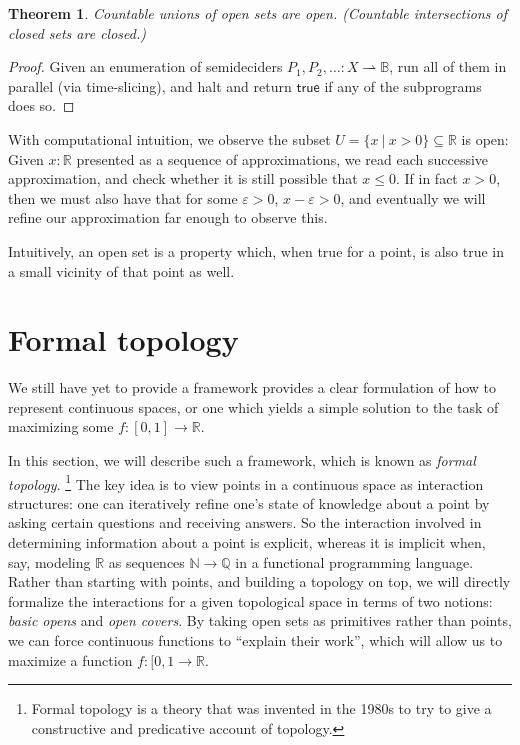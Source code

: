 \documentclass{article}
\newtheorem{theorem}{Theorem}
\newcommand{\nat}{\mathbb{N}}
\newcommand{\suchthat}{\ |\ }
\newcommand{\rat}{\mathbb{Q}}
\newcommand{\R}{\mathbb{R}}
\newcommand{\bool}{\mathbb{B}}
\begin{document}
\begin{theorem}
Countable unions of open sets are open. (Countable intersections of closed sets are closed.)
\end{theorem}
\begin{proof}
Given an enumeration of semideciders $P_1, P_2, \ldots : X \rightharpoonup \bool$, run all of them in parallel (via time-slicing), and halt and return $\mathsf{true}$ if any of the subprograms does so.
\end{proof}

With computational intuition, we observe the subset $U = \{ x \suchthat x > 0 \} \subseteq \R$ is open:
Given $x : \R$ presented as a sequence of approximations, we read each successive approximation, and check whether it is still possible that $x \le 0$. If in fact $x > 0$, then we must also have that for some $\varepsilon > 0$, $x - \varepsilon > 0$, and eventually we will refine our approximation far enough to observe this.

Intuitively, an open set is a property which, when true for a point, is also true in a small vicinity of that point as well.

\section{Formal topology}

We still have yet to provide a framework provides a clear formulation of how to represent continuous spaces, or one which yields a simple solution to the task of maximizing some $f : [0,1] \to \R$.

In this section, we will describe such a framework, which is known as \emph{formal topology}.
\footnote{Formal topology is a theory that was invented in the 1980s to try to give a constructive and predicative account of topology.}
The key idea is to view points in a continuous space as interaction structures: one can iteratively refine one's state of knowledge about a point by asking certain questions and receiving answers. So the interaction involved in determining information about a point is explicit, whereas it is implicit when, say, modeling $\R$ as sequences $\nat \to \rat$ in a functional programming language. Rather than starting with points, and building a topology on top, we will directly formalize the interactions for a given topological space in terms of two notions: \emph{basic opens} and \emph{open covers}. By taking open sets as primitives rather than points, we can force continuous functions to ``explain their work'', which will allow us to maximize a function $f : [0,1 \to \R$.
\end{document}
